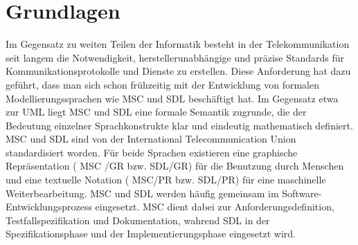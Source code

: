 \chapter{Grundlagen}
\label{ch:Grundlagen}
Im Gegensatz zu weiten Teilen der Informatik besteht in der Telekommunikation seit langem die Notwendigkeit, herstellerunabhängige und präzise Standards für Kommunikationsprotokolle und Dienste zu erstellen. Diese Anforderung hat dazu geführt, dass man sich schon frühzeitig mit der Entwicklung von formalen Modellierungssprachen wie \acs{MSC} und \acs{SDL} beschäftigt hat. Im Gegensatz etwa zur \acs{UML} liegt \acs{MSC} und \acs{SDL} eine formale Semantik zugrunde, die der Bedeutung einzelner Sprachkonstrukte klar und eindeutig mathematisch definiert.
\ac{MSC} und \ac{SDL} sind von der International Telecommunication Union standardisiert worden. Für beide Sprachen existieren eine graphische Repräsentation ( \ac{MSC} /GR bzw.  \ac{SDL}/GR) für die Benutzung durch Menschen und eine textuelle Notation ( \ac{MSC}/PR bzw. \ac{SDL}/PR) für eine maschinelle Weiterbearbeitung. \ac{MSC}  und \ac{SDL}  werden häufig gemeinsam im Software-Entwicklungsprozess eingesetzt. \ac{MSC} dient dabei zur Anforderungsdefinition, Testfallspezifikation und Dokumentation, wahrend  \ac{SDL} in der Spezifikationsphase und der Implementierungsphase eingesetzt wird.




